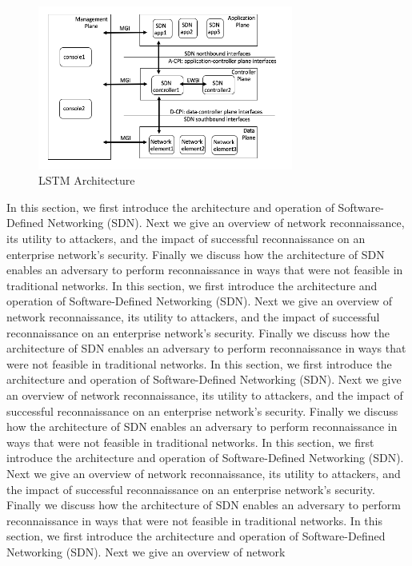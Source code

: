\begin{figure}[t]
  \centering 
  \includegraphics[width=3.3in]{img/LSTM.png} 
  \caption{LSTM Architecture} 
  \label{fig:LSTM} 
\end{figure}

In this section, we first introduce the architecture and operation of
Software-Defined Networking (SDN). Next we give an overview of network 
reconnaissance, its utility to attackers, and the impact of successful
reconnaissance on an enterprise network's security. Finally  we discuss
how the architecture of SDN enables an adversary to perform reconnaissance 
in ways that were not feasible in traditional networks. In this section, we first introduce the architecture and operation of
Software-Defined Networking (SDN). Next we give an overview of network 
reconnaissance, its utility to attackers, and the impact of successful
reconnaissance on an enterprise network's security. Finally  we discuss
how the architecture of SDN enables an adversary to perform reconnaissance 
in ways that were not feasible in traditional networks. 
In this section, we first introduce the architecture and operation of
Software-Defined Networking (SDN). Next we give an overview of network 
reconnaissance, its utility to attackers, and the impact of successful
reconnaissance on an enterprise network's security. Finally  we discuss
how the architecture of SDN enables an adversary to perform reconnaissance 
in ways that were not feasible in traditional networks. 
In this section, we first introduce the architecture and operation of
Software-Defined Networking (SDN). Next we give an overview of network 
reconnaissance, its utility to attackers, and the impact of successful
reconnaissance on an enterprise network's security. Finally  we discuss
how the architecture of SDN enables an adversary to perform reconnaissance 
in ways that were not feasible in traditional networks. In this section, we first introduce the architecture and operation of
Software-Defined Networking (SDN). Next we give an overview of network 

